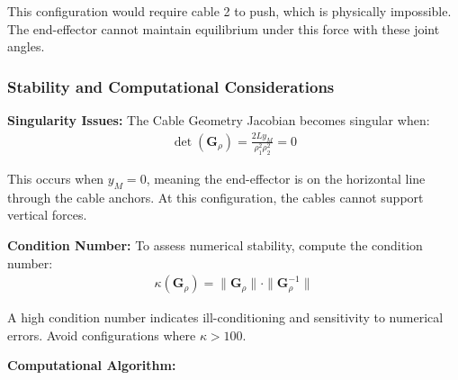 This configuration would require cable 2 to push, which is physically impossible. The end-effector cannot maintain equilibrium under this force with these joint angles.

\subsubsection{Stability and Computational Considerations}

\textbf{Singularity Issues:}
The Cable Geometry Jacobian becomes singular when:
\begin{align}
\det(\bm{G}_{\rho}) = \frac{2L y_M}{\rho_1^2 \rho_2^2} = 0
\end{align}

This occurs when $y_M = 0$, meaning the end-effector is on the horizontal line through the cable anchors. At this configuration, the cables cannot support vertical forces.

\textbf{Condition Number:}
To assess numerical stability, compute the condition number:
\begin{align}
\kappa(\bm{G}_{\rho}) = \|\bm{G}_{\rho}\| \cdot \|\bm{G}_{\rho}^{-1}\|
\end{align}

A high condition number indicates ill-conditioning and sensitivity to numerical errors. Avoid configurations where $\kappa > 100$.

\textbf{Computational Algorithm:}

